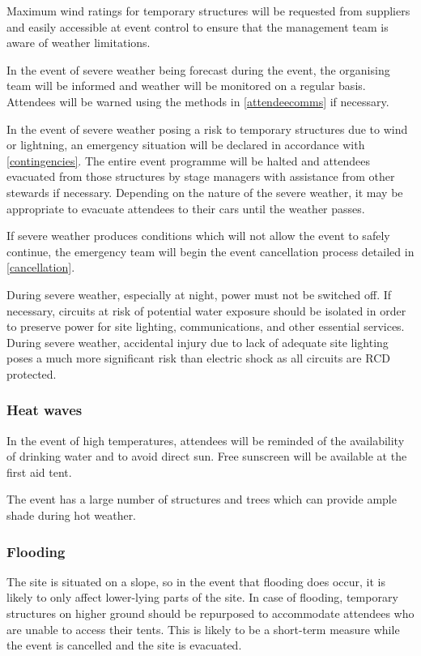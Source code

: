 Maximum wind ratings for temporary structures will be requested from suppliers and
easily accessible at event control to ensure that the management team is aware of weather
limitations.

In the event of severe weather being forecast during the event, the organising team will
be informed and weather will be monitored on a regular basis. Attendees will be warned
using the methods in \cref{attendeecomms} if necessary.

In the event of severe weather posing a risk to temporary structures due to wind or
lightning, an emergency situation will be declared in accordance with
\cref{contingencies}. The entire event programme will be halted and attendees
evacuated from those structures by stage managers with assistance from other stewards
if necessary. Depending on the nature of the severe weather, it may be appropriate to
evacuate attendees to their cars until the weather passes.

If severe weather produces conditions which will not allow the event to safely continue,
the emergency team will begin the event cancellation process detailed in
\cref{cancellation}.

During severe weather, especially at night, power must not be switched off. If
necessary, circuits at risk of potential water exposure should be isolated in
order to preserve power for site lighting, communications, and other essential services.
During severe weather, accidental injury due to lack of adequate site lighting poses a
much more significant risk than electric shock as all circuits are RCD protected.

\subsubsection{Heat waves}

In the event of high temperatures, attendees will be reminded of the availability of drinking
water and to avoid direct sun. Free sunscreen will be available at the first aid tent.

The event has a large number of structures and trees which can provide ample shade during
hot weather.

\subsubsection{Flooding}

The site is situated on a slope, so in the event that flooding does occur, it is likely to
only affect lower-lying parts of the site. In case of flooding, temporary structures on higher
ground should be repurposed to accommodate attendees who are unable to access their tents. This
is likely to be a short-term measure while the event is cancelled and the site is evacuated.

